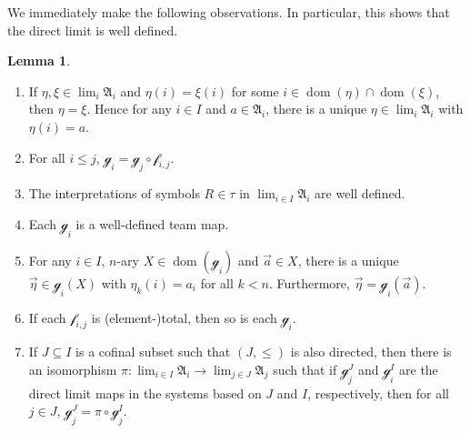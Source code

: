 \documentclass[a4paper]{amsart}
\theoremstyle{definition}
\newtheorem{lemma}[definition]{Lemma}
\theoremstyle{remark}
\newcommand{\A}{\mathcal{A}}
\DeclareMathOperator{\dom}{dom}
\theoremstyle{definition}
\renewcommand{\A}{\mathfrak{A}}
\newcommand{\f}{\mathcal{f}}
\newcommand{\g}{\mathcal{g}}
\begin{document}
We immediately make the following observations. In particular, this shows that the direct limit is well defined.

\begin{lemma}\label{Limit elements are the same iff they are the same somewhere}\quad
    \begin{enumerate}
        \item\label{Direct limit lemma first poperty}
        If $\eta,\xi\in\lim_i\A_i$ and $\eta(i)=\xi(i)$ for some $i\in\dom(\eta)\cap\dom(\xi)$, then $\eta = \xi$. Hence for any $i\in I$ and $a\in\A_i$, there is a unique $\eta\in\lim_i\A_i$ with $\eta(i)=a$.

        \item For all $i\leq j$, $\g_i = \g_j\circ\f_{i,j}$.

        \item The interpretations of symbols $R\in\tau$ in $\lim_{i\in I}\A_i$ are well defined.

        \item Each $\g_i$ is a well-defined team map.

        \item For any $i\in I$, $n$-ary $X\in\dom(\g_i)$ and $\vec a\in X$, there is a unique $\vec\eta\in\g_i(X)$ with $\eta_k(i) = a_i$ for all $k<n$. Furthermore, $\vec\eta = \g_i(\vec a)$.

        \item If each $\f_{i,j}$ is (element-)total, then so is each $\g_i$.

        \item If $J\subseteq I$ is a cofinal subset such that $(J,\leq)$ is also directed, then there is an isomorphism $\pi\colon\lim_{i\in I}\A_i\to\lim_{j\in J}\A_j$ such that if $\g^J_j$ and $\g^I_i$ are the direct limit maps in the systems based on $J$ and $I$, respectively, then for all $j\in J$, $\g^J_j = \hat\pi\circ\g^I_j$.
    \end{enumerate}
\end{lemma}
\end{document}
